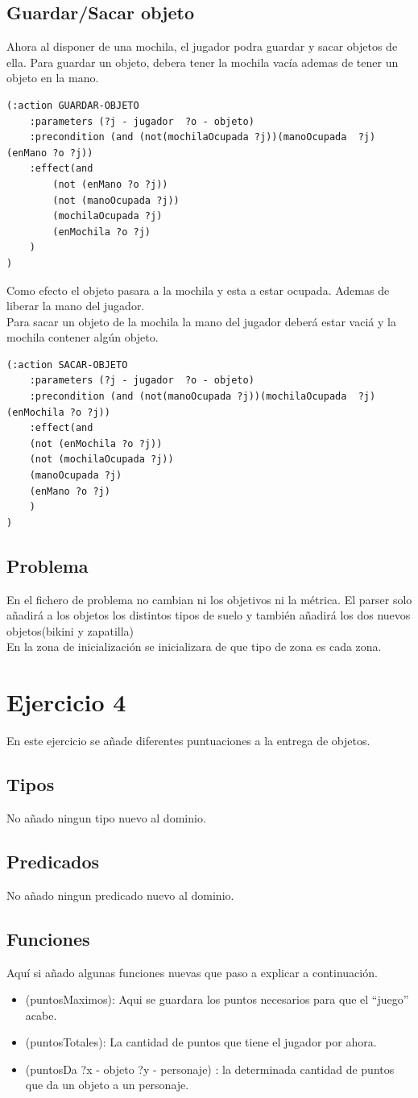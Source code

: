 \documentclass[12pt,a4paper]{article}
\begin{document}
\subsection{Guardar/Sacar objeto}
Ahora al disponer de una mochila, el jugador podra guardar y sacar objetos de ella. Para guardar un objeto, debera tener la mochila vacía ademas de tener un objeto en la mano.
\begin{lstlisting}
(:action GUARDAR-OBJETO
	:parameters (?j - jugador  ?o - objeto)
	:precondition (and (not(mochilaOcupada ?j))(manoOcupada  ?j) (enMano ?o ?j))
	:effect(and 
		(not (enMano ?o ?j))
		(not (manoOcupada ?j))
		(mochilaOcupada ?j)
		(enMochila ?o ?j)
	)
)
\end{lstlisting}
Como efecto el objeto pasara a la mochila y esta a estar ocupada. Ademas de liberar la mano del jugador.\\
Para sacar un objeto de la mochila la mano del jugador deberá estar vaciá y la mochila contener algún objeto.
\begin{lstlisting}
(:action SACAR-OBJETO
	:parameters (?j - jugador  ?o - objeto)
	:precondition (and (not(manoOcupada ?j))(mochilaOcupada  ?j) (enMochila ?o ?j))
	:effect(and 
	(not (enMochila ?o ?j))
	(not (mochilaOcupada ?j))
	(manoOcupada ?j)
	(enMano ?o ?j)
	)
)
\end{lstlisting}
\subsection{Problema}
En el fichero de problema no cambian ni los objetivos ni la métrica. El parser solo añadirá a los objetos los distintos tipos de suelo y también añadirá los dos nuevos objetos(bikini y zapatilla)\\
En la zona de inicialización se inicializara de que tipo de zona es cada zona. 
\section{Ejercicio 4}
En este ejercicio se añade diferentes puntuaciones a la entrega de objetos.
\subsection{Tipos}
No añado ningun tipo nuevo al dominio.
\subsection{Predicados}
No añado ningun predicado nuevo al dominio.
\subsection{Funciones}
Aquí si añado algunas funciones nuevas que paso a explicar a continuación. 
\begin{itemize}
\item (puntosMaximos): Aqui se guardara los puntos necesarios para que el ``juego'' acabe. 
\item (puntosTotales): La cantidad de puntos que tiene el jugador por ahora.
\item (puntosDa ?x - objeto ?y - personaje) : la determinada cantidad de puntos que da un objeto a un personaje.  
\end{itemize}
\end{document}
